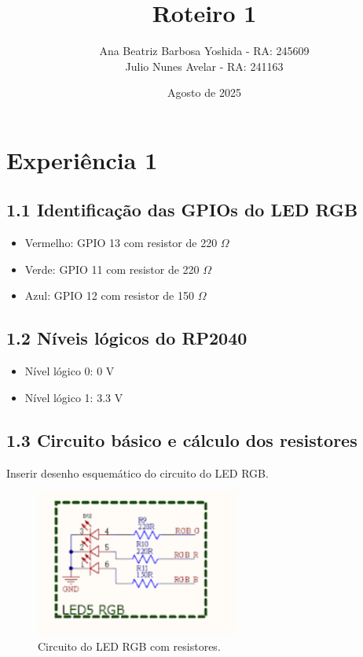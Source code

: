 \documentclass{article}
\title{Roteiro 1}
\author{Ana Beatriz Barbosa Yoshida - RA: 245609 \\ Julio Nunes Avelar - RA: 241163}
\date{Agosto de 2025}
\begin{document}
\maketitle

\tableofcontents
\newpage

\section{Experiência 1}

\subsection{1.1 Identificação das GPIOs do LED RGB}
\begin{itemize}
    \item Vermelho: GPIO 13 com resistor de 220 $\Omega$
    \item Verde: GPIO 11 com resistor de 220 $\Omega$
    \item Azul: GPIO 12 com resistor de 150 $\Omega$
\end{itemize}

\subsection{1.2 Níveis lógicos do RP2040}
\begin{itemize}
    \item Nível lógico 0: 0 V
    \item Nível lógico 1: 3.3 V
\end{itemize}

\subsection{1.3 Circuito básico e cálculo dos resistores}
Inserir desenho esquemático do circuito do LED RGB.  
\begin{figure}[H]
    \centering
    \includegraphics[width=0.6\textwidth]{circuito_led.png}
    \caption{Circuito do LED RGB com resistores.}
\end{figure}
\end{document}
